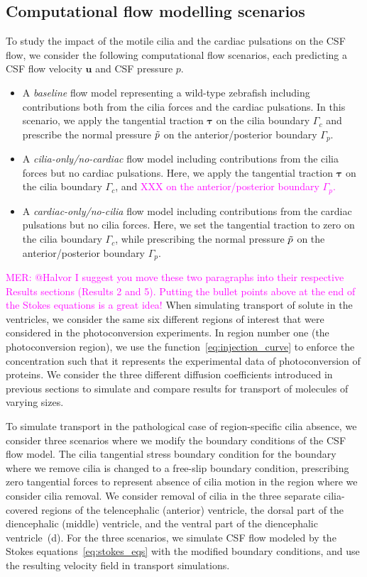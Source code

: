 \documentclass[fleqn]{wlscirep}
\newcommand{\Gc}{\Gamma_{c}}
\newcommand{\Gp}{\Gamma_{p}}
\newcommand{\uu}{\mathbf{u}}
\newcommand{\btau}{\bm{\tau}}
\newcommand{\mer}[1]{\textcolor{magenta}{#1}}
\begin{document}
\subsection*{Computational flow modelling scenarios}
To study the impact of the motile cilia and the cardiac pulsations on the CSF flow, we consider the following computational flow scenarios, each predicting a CSF flow velocity $\uu$ and CSF pressure $p$.
\begin{itemize}
    \item A \emph{baseline} flow model representing a wild-type zebrafish including contributions both from the cilia forces and the cardiac pulsations.
    In this scenario, we apply the tangential traction $\btau$ on the cilia boundary $\Gc$ and prescribe the normal pressure $\Tilde{p}$ on the anterior/posterior boundary $\Gp$. %

    \item A \emph{cilia-only/no-cardiac} flow model including contributions from the cilia forces but no cardiac pulsations.
    Here, we apply the tangential traction $\btau$ on the cilia boundary $\Gc$, and \mer{XXX on the anterior/posterior boundary $\Gp$.} %

    \item A \emph{cardiac-only/no-cilia} flow model including contributions from the cardiac pulsations but no cilia forces.
    Here, we set the tangential traction to zero on the cilia boundary $\Gc$, while prescribing the normal pressure $\Tilde{p}$ on the anterior/posterior boundary $\Gp$.  %
\end{itemize}

\mer{MER: @Halvor I suggest you move these two paragraphs into their respective Results sections (Results 2 and 5). Putting the bullet points above at the end of the Stokes equations is a great idea!}
When simulating transport of solute in the ventricles, we consider the same six different regions of interest that were considered in the photoconversion experiments. In region number one (the photoconversion region), we use the function~\eqref{eq:injection_curve} to enforce the concentration such that it represents the experimental data of photoconversion of proteins. We consider the three different diffusion coefficients introduced in previous sections to simulate and compare results for transport of molecules of varying sizes.

To simulate transport in the pathological case of region-specific cilia absence, we consider three scenarios where we modify the boundary conditions of the CSF flow model.
The cilia tangential stress boundary condition for the boundary where we remove cilia is changed to a free-slip boundary condition,
prescribing zero tangential forces to represent absence of cilia motion in the region where we consider cilia removal.
We consider removal of cilia in the three separate cilia-covered regions of the telencephalic (anterior) ventricle, the dorsal part of the diencephalic (middle) ventricle,
and the ventral part of the diencephalic ventricle~(d). For the three scenarios, we simulate CSF flow modeled by the Stokes equations~\eqref{eq:stokes_eqs} with the modified boundary conditions,
and use the resulting velocity field in transport simulations.
\end{document}
